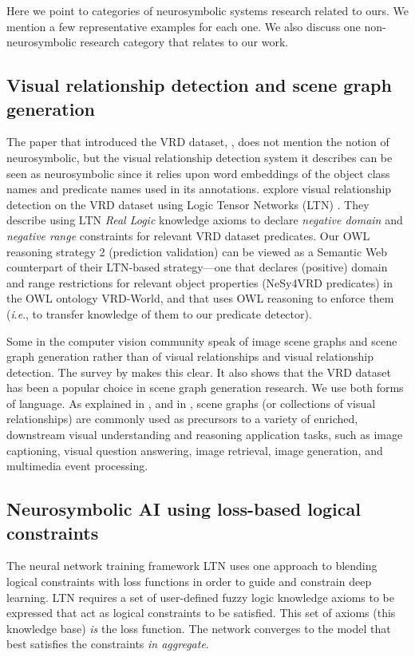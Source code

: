 \documentclass[]{jair}
\newcommand{\ie}{\textit{i}.\textit{e}.,\xspace}
\begin{document}
Here we point to categories of neurosymbolic systems research related to ours.
We mention a few representative examples for each one.
We also discuss one non-neurosymbolic research category that relates to our work.

\subsection{Visual relationship detection and scene graph generation}
The paper that introduced the VRD dataset, \citet{lu2016visual}, does not mention the notion of neurosymbolic, but the visual relationship detection system it describes can be seen as neurosymbolic since it relies upon word embeddings of the object class names and predicate names used in its annotations.
\citet{DBLP:conf/ijcnn/DonadelloS19} explore visual relationship detection on the VRD dataset using Logic Tensor Networks (LTN) \cite{DBLP:conf/nesy/SerafiniG16,DBLP:journals/ai/BadreddineGSS22}.
They describe using LTN \emph{Real Logic} knowledge axioms to declare \emph{negative domain} and \emph{negative range} constraints for relevant VRD dataset predicates.
Our OWL reasoning strategy 2 (prediction validation) can be viewed as a Semantic Web counterpart of their LTN-based strategy---one that declares (positive) domain and range restrictions for relevant object properties (NeSy4VRD predicates) in the OWL ontology VRD-World, and that uses OWL reasoning to enforce them (\ie to transfer knowledge of them to our predicate detector).

Some in the computer vision community speak of image scene graphs and scene graph generation rather than of visual relationships and visual relationship detection.
The survey by \citet{DBLP:journals/corr/abs-2201-00443} makes this clear.
It also shows that the VRD dataset has been a popular choice in scene graph generation research.
We use both forms of language.
As explained in \citet{DBLP:journals/internet/KhanBC22}, and in \citet{DBLP:journals/corr/abs-2201-00443}, scene graphs (or collections of visual relationships) are commonly used as precursors to a variety of enriched, downstream visual understanding and reasoning application tasks, such as image captioning, visual question answering, image retrieval, image generation, and multimedia event processing.

\subsection{Neurosymbolic AI using loss-based logical constraints}
The neural network training framework LTN \cite{DBLP:conf/nesy/SerafiniG16} uses one approach to blending logical constraints with loss functions in order to guide and constrain deep learning.
LTN requires a set of user-defined fuzzy logic knowledge axioms to be expressed that act as logical constraints to be satisfied. 
This set of axioms (this knowledge base) \emph{is} the loss function.
The network converges to the model that best satisfies the constraints \emph{in aggregate}.
\end{document}

